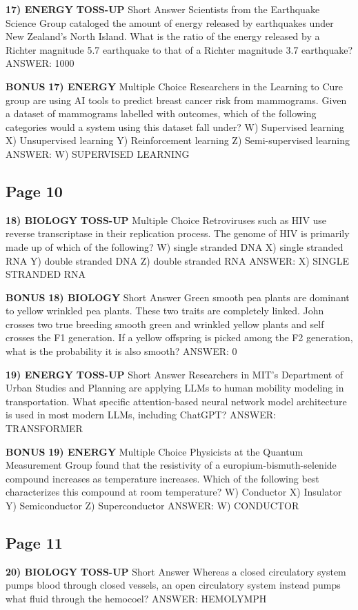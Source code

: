 \documentclass{article}
\begin{document}
\textbf{17) ENERGY}
\textbf{TOSS-UP}
Short Answer Scientists from the Earthquake Science Group cataloged the amount of energy released by earthquakes under New Zealand's North Island. What is the ratio of the energy released by a Richter magnitude 5.7 earthquake to that of a Richter magnitude 3.7 earthquake?
ANSWER: 1000

\textbf{BONUS}
\textbf{17) ENERGY}
Multiple Choice Researchers in the Learning to Cure group are using AI tools to predict breast cancer risk from mammograms. Given a dataset of mammograms labelled with outcomes, which of the following categories would a system using this dataset fall under?
W) Supervised learning
X) Unsupervised learning
Y) Reinforcement learning
Z) Semi-supervised learning
ANSWER: W) SUPERVISED LEARNING

\subsection*{Page 10}
\textbf{18) BIOLOGY}
\textbf{TOSS-UP}
Multiple Choice Retroviruses such as HIV use reverse transcriptase in their replication process. The genome of HIV is primarily made up of which of the following?
W) single stranded DNA
X) single stranded RNA
Y) double stranded DNA
Z) double stranded RNA
ANSWER: X) SINGLE STRANDED RNA

\textbf{BONUS}
\textbf{18) BIOLOGY}
Short Answer Green smooth pea plants are dominant to yellow wrinkled pea plants. These two traits are completely linked. John crosses two true breeding smooth green and wrinkled yellow plants and self crosses the F1 generation. If a yellow offspring is picked among the F2 generation, what is the probability it is also smooth?
ANSWER: 0

\textbf{19) ENERGY}
\textbf{TOSS-UP}
Short Answer Researchers in MIT's Department of Urban Studies and Planning are applying LLMs to human mobility modeling in transportation. What specific attention-based neural network model architecture is used in most modern LLMs, including ChatGPT?
ANSWER: TRANSFORMER

\textbf{BONUS}
\textbf{19) ENERGY}
Multiple Choice Physicists at the Quantum Measurement Group found that the resistivity of a europium-bismuth-selenide compound increases as temperature increases. Which of the following best characterizes this compound at room temperature?
W) Conductor
X) Insulator
Y) Semiconductor
Z) Superconductor
ANSWER: W) CONDUCTOR

\subsection*{Page 11}
\textbf{20) BIOLOGY}
\textbf{TOSS-UP}
Short Answer Whereas a closed circulatory system pumps blood through closed vessels, an open circulatory system instead pumps what fluid through the hemocoel?
ANSWER: HEMOLYMPH
\end{document}
